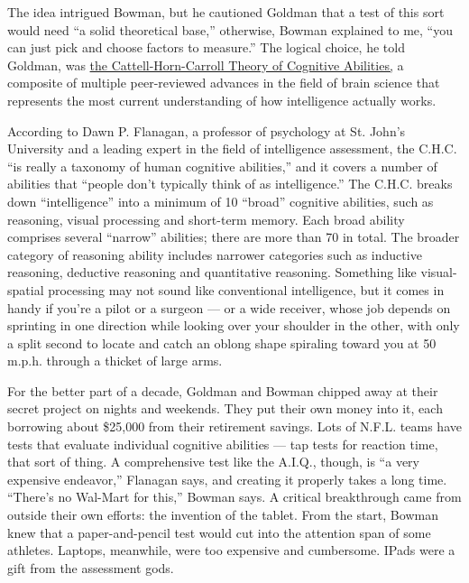 The idea intrigued Bowman, but he cautioned Goldman that a test of this
sort would need ``a solid theoretical base,'' otherwise, Bowman
explained to me, ``you can just pick and choose factors to measure.''
The logical choice, he told Goldman, was
\href{https://onlinelibrary.wiley.com/doi/full/10.1002/9781118660584.ese0431}{the
Cattell-Horn-Carroll Theory of Cognitive Abilities,} a composite of
multiple peer-reviewed advances in the field of brain science that
represents the most current understanding of how intelligence actually
works.

According to Dawn P. Flanagan, a professor of psychology at St. John's
University and a leading expert in the field of intelligence assessment,
the C.H.C. ``is really a taxonomy of human cognitive abilities,'' and it
covers a number of abilities that ``people don't typically think of as
intelligence.'' The C.H.C. breaks down ``intelligence'' into a minimum
of 10 ``broad'' cognitive abilities, such as reasoning, visual
processing and short-term memory. Each broad ability comprises several
``narrow'' abilities; there are more than 70 in total. The broader
category of reasoning ability includes narrower categories such as
inductive reasoning, deductive reasoning and quantitative reasoning.
Something like visual-spatial processing may not sound like conventional
intelligence, but it comes in handy if you're a pilot or a surgeon ---
or a wide receiver, whose job depends on sprinting in one direction
while looking over your shoulder in the other, with only a split second
to locate and catch an oblong shape spiraling toward you at 50 m.p.h.
through a thicket of large arms.

For the better part of a decade, Goldman and Bowman chipped away at
their secret project on nights and weekends. They put their own money
into it, each borrowing about \$25,000 from their retirement savings.
Lots of N.F.L. teams have tests that evaluate individual cognitive
abilities --- tap tests for reaction time, that sort of thing. A
comprehensive test like the A.I.Q., though, is ``a very expensive
endeavor,'' Flanagan says, and creating it properly takes a long time.
``There's no Wal-Mart for this,'' Bowman says. A critical breakthrough
came from outside their own efforts: the invention of the tablet. From
the start, Bowman knew that a paper-and-pencil test would cut into the
attention span of some athletes. Laptops, meanwhile, were too expensive
and cumbersome. IPads were a gift from the assessment gods.

